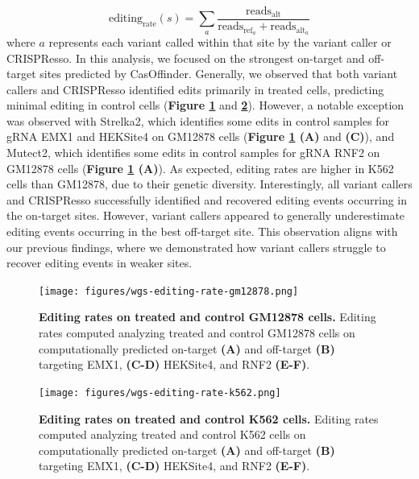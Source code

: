 \documentclass[a4paper, titlepage, openright]{book}
\begin{document}
\[
    \text{editing}_{\text{rate}}(s) = \sum_{a}{\frac{\text{reads}_{\text{alt}}}{\text{reads}_{\text{ref}_{a}} + \text{reads}_{\text{alt}_{a}}}}
\]
where $a$ represents each variant called within that site by the variant caller or CRISPResso. In this analysis, we focused on the strongest on-target and off-target sites predicted by CasOffinder. Generally, we observed that both variant callers and CRISPResso identified edits primarily in treated cells, predicting minimal editing in control cells (\textbf{Figure \ref{fig:wgs-edits-rate-gm12878}} and \textbf{\ref{fig:wgs-edits-rate-k562}}). However, a notable exception was observed with Strelka2, which identifies some edits in control samples for gRNA EMX1 and HEKSite4 on GM12878 cells (\textbf{Figure \ref{fig:wgs-edits-rate-gm12878} (A)} and \textbf{(C)}), and Mutect2, which identifies some edits in control samples for gRNA RNF2 on GM12878 cells (\textbf{Figure \ref{fig:wgs-edits-rate-gm12878} (A)}). As expected, editing rates are higher in K562 cells than GM12878, due to their genetic diversity. Interestingly, all variant callers and CRISPResso successfully identified and recovered editing events occurring in the on-target sites. However, variant callers appeared to generally underestimate editing events occurring in the best off-target site. This observation aligns with our previous findings, where we demonstrated how variant callers struggle to recover editing events in weaker sites.
\begin{figure}[!]
    \centering
    \texttt{[image: figures/wgs-editing-rate-gm12878.png]}
    \caption[Editing rates on treated and control GM12878 cells ]{\textbf{Editing rates on treated and control GM12878 cells.} Editing rates computed analyzing treated and control GM12878 cells on computationally predicted on-target \textbf{(A)} and off-target \textbf{(B)} targeting EMX1, \textbf{(C-D)} HEKSite4, and RNF2 \textbf{(E-F)}.}
    \label{fig:wgs-edits-rate-gm12878}
\end{figure}
\begin{figure}[!]
    \centering
    \texttt{[image: figures/wgs-editing-rate-k562.png]}
    \caption[Editing rates on treated and control K562 cells ]{\textbf{Editing rates on treated and control K562 cells.} Editing rates computed analyzing treated and control K562 cells on computationally predicted on-target \textbf{(A)} and off-target \textbf{(B)} targeting EMX1, \textbf{(C-D)} HEKSite4, and RNF2 \textbf{(E-F)}.}
    \label{fig:wgs-edits-rate-k562}
\end{figure}
\end{document}
